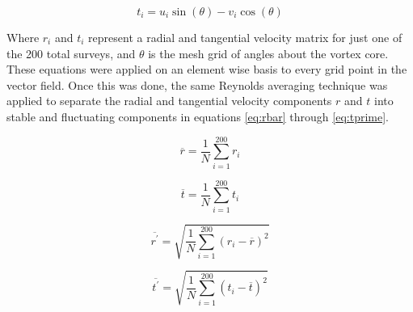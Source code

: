 \begin{equation}
t_i = u_i \sin{(\theta)} - v_i \cos{(\theta)}
\label{eq:uv_t}
\end{equation}

Where $r_i$ and $t_i$ represent a radial and tangential velocity matrix for 
just one of the 200 total surveys, and $\theta$ is the mesh grid of angles 
about the vortex core. These equations were applied on an element wise basis to 
every grid point in the vector field. Once this was done, the same Reynolds 
averaging technique was applied to separate the radial and tangential velocity 
components $r$ and $t$ into stable and fluctuating components in equations 
\ref{eq:rbar} through \ref{eq:tprime}.

\begin{equation}
\overline{r}  = \frac{1}{N} \sum_{i=1}^{200} r_i
\label{eq:rbar}
\end{equation}

\begin{equation}
\overline{t}  = \frac{1}{N} \sum_{i=1}^{200} t_i
\label{eq:tbar}
\end{equation}

\begin{equation}
\overline{r^\prime} = \sqrt{\frac{1}{N} \sum_{i=1}^{200} (r_i - \overline{r})^2}
\label{eq:rprime}
\end{equation}

\begin{equation}
\overline{t^\prime} = \sqrt{\frac{1}{N} \sum_{i=1}^{200} (t_i - \overline{t})^2}
\label{eq:tprime}
\end{equation}

